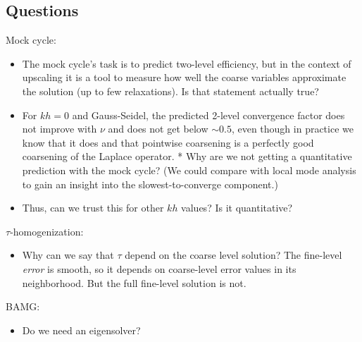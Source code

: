 \documentclass{article}
\begin{document}
\subsection{Questions}
Mock cycle:
\begin{itemize}
\item The mock cycle's task is to predict two-level efficiency, but in the context of upscaling it is a tool to measure how well the coarse variables approximate the solution (up to few relaxations). Is that statement actually true?
\item For $kh = 0$ and Gauss-Seidel, the predicted 2-level convergence factor does not improve with $\nu$ and does not get below $\sim 0.5$, even though in practice we know that it does and that pointwise coarsening is a perfectly good coarsening of the Laplace operator.
* Why are we not getting a quantitative prediction with the mock cycle? (We could compare with local mode analysis to gain an insight into the slowest-to-converge component.)
\item Thus, can we trust this for other $kh$ values? Is it quantitative?
\end{itemize}
$\tau$-homogenization:
\begin{itemize}
	\item Why can we say that $\tau$ depend on the coarse level solution? The fine-level \emph{error} is smooth, so it depends on coarse-level error values in its neighborhood. But the full fine-level solution is not.
\end{itemize}
BAMG:
\begin{itemize}
	\item Do we need an eigensolver?
\end{itemize}



\end{document}
